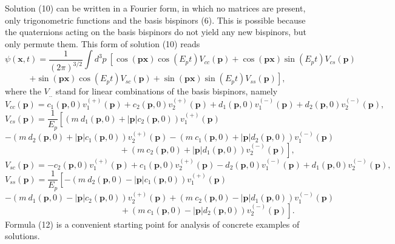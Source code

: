 \documentclass[12pt]{article}
\begin{document}
Solution (10) can be written in a Fourier form, in which no matrices are present,  only trigonometric functions and the basis bispinors  (6).  This is possible because the quaternions acting on the basis bispinors  do not yield any  new bispinors, but only  permute them.  This form of  solution (10)  reads 
\begin{equation*} \psi(\mathbf{x}, t) = \frac{1}{(2\pi)^{3/2}} \int\!d^3p\: \left[\cos(\mathbf{p}\mathbf{x}) \cos(E_pt) V_{cc}(\mathbf{p})  + \cos(\mathbf{p}\mathbf{x}) \sin(E_pt) V_{cs}(\mathbf{p}) \right. \end{equation*}  \begin{equation} \left.+ \sin(\mathbf{p}\mathbf{x}) \cos(E_pt) V_{sc}(\mathbf{p})+ \sin(\mathbf{p}\mathbf{x}) \sin(E_pt) V_{ss}(\mathbf{p})   \right],
\end{equation}
where the $V_{..}$ stand  for linear combinations of the basis  bispinors, namely
\[ V_{cc}(\mathbf{p})= c_1(\mathbf{p},0) v^{(+)}_1(\mathbf{p}) + c_2(\mathbf{p},0) v^{(+)}_2(\mathbf{p}) +d_1(\mathbf{p},0) v^{(-)}_1(\mathbf{p})+d_2(\mathbf{p},0) v^{(-)}_2(\mathbf{p}), \]
\[V_{cs}(\mathbf{p}) =\frac{1}{E_p} \left[ \left( m\: d_1(\mathbf{p},0) + |\mathbf{p}| c_2(\mathbf{p},0)     \right) v^{(+)}_1(\mathbf{p})  \right.  \;\;\;\;\;\;\;\;\;\;\;\;\;\; \;\;\;\;\;\;\;\;\;\;\;\;\;\; \;\;\;\;\;\;\;\;\;\;\;\;\;\;\;\;\;   \]  \[  -  \left( m \:d_2(\mathbf{p},0) + |\mathbf{p}| c_1(\mathbf{p},0)     \right) v^{(+)}_2(\mathbf{p}) 
  - \left( m\: c_1(\mathbf{p},0) + |\mathbf{p}| d_2(\mathbf{p},0)     \right) v^{(-)}_1(\mathbf{p})  \]  \[  \left.  \;\;\;\;\;\;\;\;\;\;\;\;\;\; \;\;\;\;\;\;\;\;\;\;\;\;\;\; \;\;\;\;\;\;\;\;\;\;\;\;\;\;  + \left( m\: c_2(\mathbf{p},0) + |\mathbf{p}| d_1(\mathbf{p},0)     \right) v^{(-)}_2(\mathbf{p})   \right], \]
\[V_{sc}(\mathbf{p})=- c_2(\mathbf{p},0) v^{(+)}_1(\mathbf{p}) + c_1(\mathbf{p},0) v^{(+)}_2(\mathbf{p}) - d_2(\mathbf{p},0) v^{(-)}_1(\mathbf{p})+d_1(\mathbf{p},0) v^{(-)}_2(\mathbf{p}), \]   
\[V_{ss}(\mathbf{p}) =\frac{1}{E_p} \left[- \left( m\: d_2(\mathbf{p},0) - |\mathbf{p}| c_1(\mathbf{p},0)     \right) v^{(+)}_1(\mathbf{p})  \;\;\;\;\;\;\;\;\;\;\;\;\;\; \;\;\;\;\;\;\;\;\;\;\;\;\;\;\;\;\;\;\;\;\;\;\;\;\;\;\; \right. \]  \[ -  \left( m\: d_1(\mathbf{p},0) - |\mathbf{p}| c_2(\mathbf{p},0)     \right) v^{(+)}_2(\mathbf{p}) 
 + \left( m\: c_2(\mathbf{p},0) - |\mathbf{p}| d_1(\mathbf{p},0)     \right) v^{(-)}_1(\mathbf{p}) \]   \[  \left.  \;\;\;\;\;\;\;\;\;\;\;\;\;\; \;\;\;\;\;\;\;\;\;\;\;\;\;\; \;\;\;\;\;\;\;\;\;\;\;\;\;\; +  \left( m\: c_1(\mathbf{p},0) - |\mathbf{p}| d_2(\mathbf{p},0)     \right) v^{(-)}_2(\mathbf{p})   \right]. \]
Formula  (12)  is a convenient starting point for analysis of concrete examples of solutions. 
\end{document}

